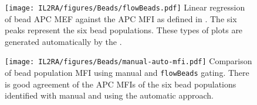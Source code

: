 \begin{figure}[hb]
\centering
\texttt{[image: IL2RA/figures/Beads/flowBeads.pdf]}
{ Linear regression of bead APC MEF against the APC MFI as defined in .}
{
The six peaks represent the six bead populations.
These types of plots are generated automatically by the .
}
\end{figure}


\begin{figure}[hb]
\centering
\texttt{[image: IL2RA/figures/Beads/manual-auto-mfi.pdf]}
{ Comparison of bead population MFI using manual and \texttt{flowBeads} gating.  }
{ There is good agreement of the APC MFIs of the six bead populations identified with manual and using the automatic approach. }
\end{figure}



